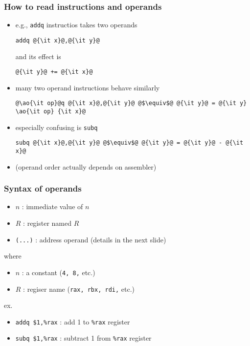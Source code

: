 \documentclass[12pt,dvipdfmx]{beamer}
\newcommand{\ao}[1]{{\color{blue}#1}}
\begin{document}
\begin{frame}[fragile]
  \frametitle{How to read instructions and operands}
  \begin{itemize}
  \item e.g., {\tt addq} instructios takes two operands
\begin{lstlisting}
addq @{\it x}@,@{\it y}@
\end{lstlisting}
and its effect is 
\begin{lstlisting}
@{\it y}@ += @{\it x}@
\end{lstlisting}
\item many two operand instructions behave similarly
\begin{lstlisting}
@\ao{\it op}@q @{\it x}@,@{\it y}@ @$\equiv$@ @{\it y}@ = @{\it y} \ao{\it op} {\it x}@
\end{lstlisting}
\item especially confusing is \ao{\tt subq}
\begin{lstlisting}
subq @{\it x}@,@{\it y}@ @$\equiv$@ @{\it y}@ = @{\it y}@ - @{\it x}@
\end{lstlisting}
\item (operand order actually depends on assembler)
\end{itemize}
\end{frame}

\begin{frame}
  \frametitle{Syntax of operands}
  \begin{itemize}
  \item \ao{{\tt \$}$n$} : immediate value of $n$
  \item \ao{{\tt \%}$R$} : register named $R$
  \item \ao{\tt (...)} : address operand (details in the next slide)
  \end{itemize}
  where
  \begin{itemize}
  \item $n$ : a constant ({\tt 4, 8,} etc.)
  \item $R$ : regiser name ({\tt rax, rbx, rdi,} etc.)
  \end{itemize}
  ex.
  \begin{itemize}
  \item \ao{\tt addq \$1,\%rax} : add 1 to {\tt \%rax} register
  \item \ao{\tt subq \$1,\%rax} : subtract 1 from {\tt \%rax} register
  \end{itemize}
\end{frame}
\end{document}
